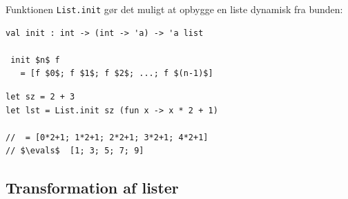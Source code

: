 \documentclass[rgb]{beamer}
\begin{document}
\begin{frame}[fragile]
\begin{footnotesize}


  \vspace{1ex}

  Funktionen \lstinline{List.init} gør det muligt at opbygge en liste
  dynamisk fra bunden:

\begin{lstlisting}[numbers=none,frame=none,mathescape]
val init : int -> (int -> 'a) -> 'a list

 init $n$ f
   = [f $0$; f $1$; f $2$; ...; f $(n-1)$]
\end{lstlisting}

  \vspace{1ex}


\begin{lstlisting}[numbers=none,frame=none,mathescape]
let sz = 2 + 3
let lst = List.init sz (fun x -> x * 2 + 1)

//  = [0*2+1; 1*2+1; 2*2+1; 3*2+1; 4*2+1]
// $\evals$  [1; 3; 5; 7; 9]
\end{lstlisting}

\end{footnotesize}
\end{frame}

\subsection{Transformation af lister}
\end{document}
